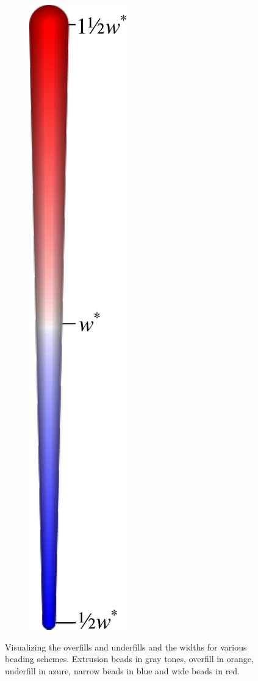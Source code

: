 \begin{figure}
\begin{subfigure}{.04\columnwidth}
\includegraphics[height=\figheight]{sources/validation/gMAT_example/widths_legend.pdf}
\end{subfigure}
\caption{
Visualizing the overfills and underfills and the widths for various beading schemes.
Extrusion beads in gray tones,
overfill in orange,
underfill in azure,
narrow beads in blue
and wide beads in red.
}
\label{visualized_accuracy}
\end{figure}


